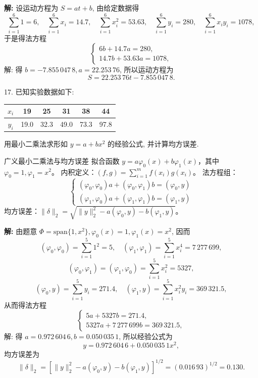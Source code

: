\documentclass[a4paper,11pt]{ctexart}
\begin{document}
\textbf{解: } 设运动方程为 $S = at+b$, 由给定数据得
\[
\sum_{i=1}^6 1 = 6, \quad \sum_{i=1}^6 x_i = 14.7, \quad \sum_{i=1}^6 x_i^2 = 53.63, \quad \sum_{i=1}^6 y_i = 280, \quad \sum_{i=1}^6 x_i y_i = 1078,
\]
于是得法方程
\[
\begin{cases}
6b + 14.7a = 280, \\
14.7b + 53.63a = 1078,
\end{cases}
\]
解: 得 $b = -7.855\,047\,8, a = 22.253\,76$, 所以运动方程为
\[
S = 22.253\,76 t - 7.855\,047\,8.
\]

\vspace{2em}

17. 已知实验数据如下:
\begin{center}
\begin{tabular}{c|c|c|c|c|c}
\toprule
$x_i$ & 19 & 25 & 31 & 38 & 44 \\
\midrule
$y_i$ & 19.0 & 32.3 & 49.0 & 73.3 & 97.8 \\
\bottomrule
\end{tabular}
\end{center}
用最小二乘法求形如 $y = a + bx^2$ 的经验公式, 并计算均方误差.

\begin{theorybox}{广义最小二乘法与均方误差}
拟合函数 $y = a\varphi_0(x) + b\varphi_1(x)$，其中 $\varphi_0=1, \varphi_1=x^2$。
内积定义：$(f, g) = \sum_{i=1}^m f(x_i)g(x_i)$。
法方程组：
\[
\begin{cases}
(\varphi_0, \varphi_0)a + (\varphi_0, \varphi_1)b = (\varphi_0, y) \\
(\varphi_1, \varphi_0)a + (\varphi_1, \varphi_1)b = (\varphi_1, y)
\end{cases}
\]
均方误差：$\|\delta\|_2 = \sqrt{\|y\|_2^2 - a(\varphi_0, y) - b(\varphi_1, y)}$。
\end{theorybox}

\textbf{解: } 由题意 $\Phi = \text{span}\{1, x^2\}, \varphi_0(x) = 1, \varphi_1(x) = x^2$, 因而
\[
(\varphi_0, \varphi_0) = \sum_{i=1}^5 1^2 = 5, \quad (\varphi_1, \varphi_1) = \sum_{i=1}^5 x_i^4 = 7\,277\,699,
\]
\[
(\varphi_0, \varphi_1) = (\varphi_1, \varphi_0) = \sum_{i=1}^5 x_i^2 = 5327,
\]
\[
(\varphi_0, y) = \sum_{i=1}^5 y_i = 271.4, \quad (\varphi_1, y) = \sum_{i=1}^5 x_i^2 y_i = 369\,321.5,
\]
从而得法方程
\[
\begin{cases}
5a + 5327b = 271.4, \\
5327a + 7\,277\,699b = 369\,321.5,
\end{cases}
\]
解: 得 $a = 0.972\,604\,6, b = 0.050\,035\,1$, 所以经验公式为
\[
y = 0.972\,604\,6 + 0.050\,035\,1 x^2,
\]
均方误差为
\[
\|\delta\|_2 = [\|y\|_2^2 - a(\varphi_0, y) - b(\varphi_1, y)]^{1/2} = (0.016\,93)^{1/2} = 0.130.
\]
\end{document}
